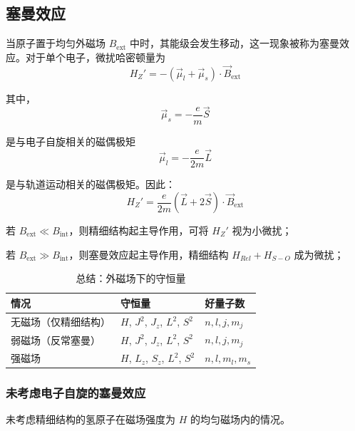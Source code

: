 \subsection{塞曼效应}

当原子置于均匀外磁场 \( B_{\text{ext}} \) 中时，其能级会发生移动，这一现象被称为塞曼效应。对于单个电子，微扰哈密顿量为
\begin{equation}
	H_Z' = -(\vec{\mu}_l + \vec{\mu}_s) \cdot \vec{B}_{\text{ext}}
\end{equation}

其中，
\begin{equation}
	\vec{\mu}_s = -\frac{e}{m} \vec{S}
\end{equation}

是与电子自旋相关的磁偶极矩
\begin{equation}
	\vec{\mu}_l = -\frac{e}{2m} \vec{L}
\end{equation}

是与轨道运动相关的磁偶极矩。因此：
\begin{equation}
	H_Z' = \frac{e}{2m} (\vec{L} + 2\vec{S}) \cdot \vec{B}_{\text{ext}}
\end{equation}

若 \( B_{\text{ext}} \ll B_{\text{int}} \)，则精细结构起主导作用，可将 \( H_Z' \) 视为小微扰；

若 \( B_{\text{ext}} \gg B_{\text{int}} \)，则塞曼效应起主导作用，精细结构 \( H_{Rel} + H_{S-O} \) 成为微扰；
\begin{table}[htbp]
	\centering
	\caption{总结：外磁场下的守恒量}
	\label{tab:conservation-external-B}
	\begin{tabular}{p{4cm} p{4cm} p{3.2cm} }
		\toprule
		\textbf{情况} & \textbf{守恒量} & \textbf{好量子数}  \\
		\midrule
		无磁场（仅精细结构） & 
		$H$, $J^{2}$, $J_{z}$, $L^{2}$, $S^{2}$ & 
		$n, l, j, m_j$   \\
		\midrule
		弱磁场（反常塞曼） & 
		$H$, $J^{2}$, $J_{z}$, $L^{2}$, $S^{2}$ & 
		$n, l, j, m_j$  \\
		\midrule
		强磁场 & 
		$H$, $L_{z}$, $S_{z}$, $L^{2}$, $S^{2}$ & 
		$n, l, m_l, m_s$  \\
		\bottomrule
	\end{tabular}
\end{table}
\subsubsection{未考虑电子自旋的塞曼效应}
未考虑精细结构的氢原子在磁场强度为 $H$ 的均匀磁场内的情况。

